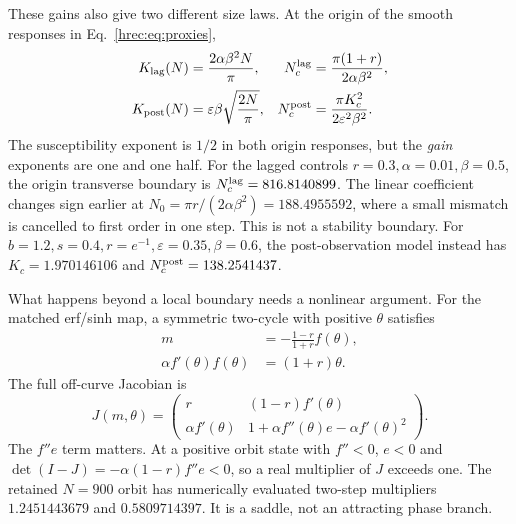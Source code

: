 These gains also give two different size laws. At the origin of the smooth responses in Eq.~\eqref{hrec:eq:proxies},
\begin{align}
 K_{\rm lag}(N)&=\frac{2\alpha\beta^2N}{\pi},
 &N_c^{\rm lag}&=\frac{\pi(1+r)}{2\alpha\beta^2},\nonumber\\
 K_{\rm post}(N)&=\varepsilon\beta\sqrt{\frac{2N}{\pi}},
 &N_c^{\rm post}&=\frac{\pi K_c^2}{2\varepsilon^2\beta^2}.
 \label{hrec:eq:size-laws}
\end{align}
The susceptibility exponent is \(1/2\) in both origin responses, but the \emph{gain} exponents are one and one half. For the lagged controls \(r=0.3,\alpha=0.01,\beta=0.5\), the origin transverse boundary is \(N_c^{\rm lag}=816.8140899\). The linear coefficient changes sign earlier at \(N_0=\pi r/(2\alpha\beta^2)=188.4955592\), where a small mismatch is cancelled to first order in one step. This is not a stability boundary. For \(b=1.2,s=0.4,r=e^{-1},\varepsilon=0.35,\beta=0.6\), the post-observation model instead has \(K_c=1.970146106\) and \(N_c^{\rm post}=138.2541437\).

What happens beyond a local boundary needs a nonlinear argument. For the matched erf/sinh map, a symmetric two-cycle with positive \(\theta\) satisfies
\begin{equation}
 \begin{aligned}
 m&=-\frac{1-r}{1+r}f(\theta),\\
 \alpha f'(\theta)f(\theta)&=(1+r)\theta.
 \end{aligned}
 \label{hrec:eq:matched-cycle}
\end{equation}
The full off-curve Jacobian is
\begin{equation}
 J(m,\theta)=
 \begin{pmatrix}
 r&(1-r)f'(\theta)\\
 \alpha f'(\theta)&1+\alpha f''(\theta)e-\alpha f'(\theta)^2
 \end{pmatrix}.
 \label{hrec:eq:full-jacobian}
\end{equation}
The \(f''e\) term matters. At a positive orbit state with \(f''<0\), \(e<0\) and
\(\det(I-J)=-\alpha(1-r)f''e<0\), so a real multiplier of \(J\) exceeds one. The retained \(N=900\) orbit has numerically evaluated two-step multipliers \(1.2451443679\) and \(0.5809714397\). It is a saddle, not an attracting phase branch.

